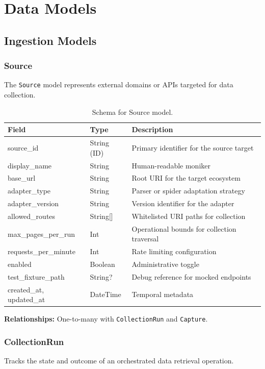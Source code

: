 \section{Data Models}

\subsection{Ingestion Models}

\subsubsection{Source}
The \texttt{Source} model represents external domains or APIs targeted for data collection.

\begin{table}[h]
\centering
\begin{tabular}{|l|l|l|}
\hline
\textbf{Field} & \textbf{Type} & \textbf{Description} \\
\hline
source\_id & String (ID) & Primary identifier for the source target \\
display\_name & String & Human-readable moniker \\
base\_url & String & Root URI for the target ecosystem \\
adapter\_type & String & Parser or spider adaptation strategy \\
adapter\_version & String & Version identifier for the adapter \\
allowed\_routes & String[] & Whitelisted URI paths for collection \\
max\_pages\_per\_run & Int & Operational bounds for collection traversal \\
requests\_per\_minute & Int & Rate limiting configuration \\
enabled & Boolean & Administrative toggle \\
test\_fixture\_path & String? & Debug reference for mocked endpoints \\
created\_at, updated\_at & DateTime & Temporal metadata \\
\hline
\end{tabular}
\caption{Schema for Source model.}
\end{table}
\noindent \textbf{Relationships:} One-to-many with \texttt{CollectionRun} and \texttt{Capture}.

\subsubsection{CollectionRun}
Tracks the state and outcome of an orchestrated data retrieval operation.

